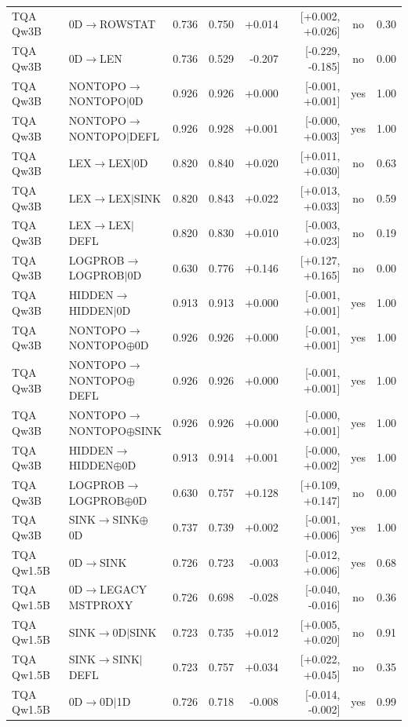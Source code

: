 \begin{longtable}{llrrrrcc}
TQA Qw3B & 0D$\to$ROWSTAT & 0.736 & 0.750 & +0.014 & [+0.002, +0.026] & no & 0.30 \\
TQA Qw3B & 0D$\to$LEN & 0.736 & 0.529 & -0.207 & [-0.229, -0.185] & no & 0.00 \\
TQA Qw3B & NONTOPO$\to$NONTOPO$\mid$0D & 0.926 & 0.926 & +0.000 & [-0.001, +0.001] & yes & 1.00 \\
TQA Qw3B & NONTOPO$\to$NONTOPO$\mid$DEFL & 0.926 & 0.928 & +0.001 & [-0.000, +0.003] & yes & 1.00 \\
TQA Qw3B & LEX$\to$LEX$\mid$0D & 0.820 & 0.840 & +0.020 & [+0.011, +0.030] & no & 0.63 \\
TQA Qw3B & LEX$\to$LEX$\mid$SINK & 0.820 & 0.843 & +0.022 & [+0.013, +0.033] & no & 0.59 \\
TQA Qw3B & LEX$\to$LEX$\mid$DEFL & 0.820 & 0.830 & +0.010 & [-0.003, +0.023] & no & 0.19 \\
TQA Qw3B & LOGPROB$\to$LOGPROB$\mid$0D & 0.630 & 0.776 & +0.146 & [+0.127, +0.165] & no & 0.00 \\
TQA Qw3B & HIDDEN$\to$HIDDEN$\mid$0D & 0.913 & 0.913 & +0.000 & [-0.001, +0.001] & yes & 1.00 \\
TQA Qw3B & NONTOPO$\to$NONTOPO$\oplus$0D & 0.926 & 0.926 & +0.000 & [-0.001, +0.001] & yes & 1.00 \\
TQA Qw3B & NONTOPO$\to$NONTOPO$\oplus$DEFL & 0.926 & 0.926 & +0.000 & [-0.001, +0.001] & yes & 1.00 \\
TQA Qw3B & NONTOPO$\to$NONTOPO$\oplus$SINK & 0.926 & 0.926 & +0.000 & [-0.000, +0.001] & yes & 1.00 \\
TQA Qw3B & HIDDEN$\to$HIDDEN$\oplus$0D & 0.913 & 0.914 & +0.001 & [-0.000, +0.002] & yes & 1.00 \\
TQA Qw3B & LOGPROB$\to$LOGPROB$\oplus$0D & 0.630 & 0.757 & +0.128 & [+0.109, +0.147] & no & 0.00 \\
TQA Qw3B & SINK$\to$SINK$\oplus$0D & 0.737 & 0.739 & +0.002 & [-0.001, +0.006] & yes & 1.00 \\
TQA Qw1.5B & 0D$\to$SINK & 0.726 & 0.723 & -0.003 & [-0.012, +0.006] & yes & 0.68 \\
TQA Qw1.5B & 0D$\to$LEGACY MSTPROXY & 0.726 & 0.698 & -0.028 & [-0.040, -0.016] & no & 0.36 \\
TQA Qw1.5B & SINK$\to$0D$\mid$SINK & 0.723 & 0.735 & +0.012 & [+0.005, +0.020] & no & 0.91 \\
TQA Qw1.5B & SINK$\to$SINK$\mid$DEFL & 0.723 & 0.757 & +0.034 & [+0.022, +0.045] & no & 0.35 \\
TQA Qw1.5B & 0D$\to$0D$\mid$1D & 0.726 & 0.718 & -0.008 & [-0.014, -0.002] & yes & 0.99 \\

\end{longtable}
